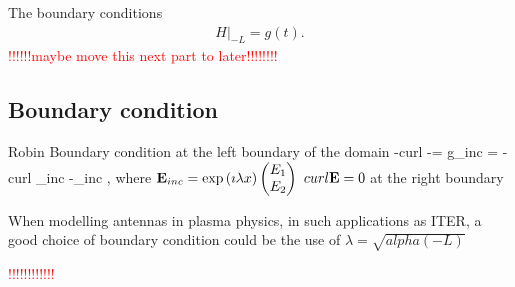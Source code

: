 The boundary conditions
\begin{align*}
H|_{-L}=g(t).
\end{align*}
\textcolor{red}{!!!!!!maybe move this next part to later!!!!!!!!}
\subsection{Boundary condition}
Robin Boundary condition at the left boundary of the domain
\be
-curl \E -\imath \lambda\E \wedge \n = g_{inc} = -curl \E_{inc} -\imath \lambda\E_{inc} \wedge \n,
\ee
where ${\bf E}_{inc} = \exp \left(\imath \lambda x\right)\begin{pmatrix} E_1\\ E_2 \end{pmatrix}$
$curl {\bf E} = 0$ at the right boundary
\begin{remark}
	When modelling antennas in plasma physics, in such applications as ITER, a good choice of boundary condition could be the use of $\lambda = \sqrt{alpha(-L)}$
\end{remark}
\textcolor{red}{!!!!!!!!!!!!}
